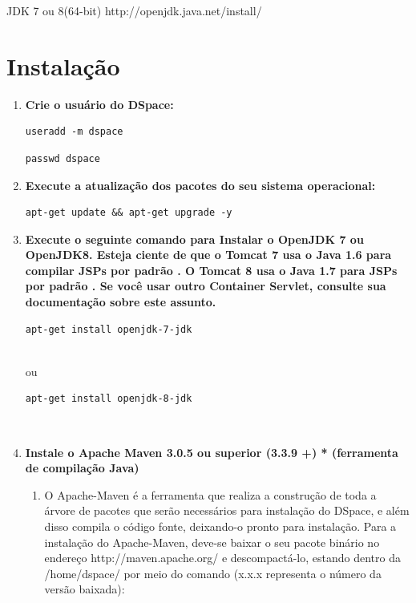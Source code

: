 \documentclass[12pt,hidelinks]{article}
\begin{document}
    \textbullet \hspace{6pt} JDK 7 ou 8(64-bit) http://openjdk.java.net/install/

\newpage
\section{Instalação}
\newpage
\begin{enumerate}
    
    \item \textbf{Crie o usuário do DSpace:} 
    
        \begin{verbatim}
useradd -m dspace
        \end{verbatim}
    
        \begin{verbatim}
passwd dspace
        \end{verbatim}
    
   
    \item \textbf{Execute a atualização dos pacotes do seu sistema operacional:} 
    
        \begin{verbatim}
apt-get update && apt-get upgrade -y
        \end{verbatim}
   
    \item \textbf{Execute o seguinte comando para Instalar o OpenJDK 7 ou OpenJDK8. Esteja ciente de que o Tomcat 7 usa o Java 1.6 para compilar JSPs por padrão . O Tomcat 8 usa o Java 1.7 para JSPs por padrão . Se você usar outro Container Servlet, consulte sua documentação sobre este assunto.}
     
        \begin{verbatim}
apt-get install openjdk-7-jdk
        \end{verbatim}\\
        
        ou
    
        \begin{verbatim}
apt-get install openjdk-8-jdk
        \end{verbatim}\\       
        
    \item \textbf{Instale o Apache Maven 3.0.5 ou superior (3.3.9 +) * (ferramenta de compilação Java)}\\
        \begin{enumerate}
            \item O Apache-Maven é a ferramenta que realiza a construção de toda a árvore de pacotes que serão necessários para instalação do DSpace, e além disso compila o código fonte, deixando-o pronto para instalação. Para a instalação do Apache-Maven, deve-se baixar o seu pacote binário no endereço http://maven.apache.org/ e descompactá-lo, estando dentro da /home/dspace/ por meio do comando (x.x.x representa o número da versão baixada):
        \end{enumerate}
        

\end{enumerate}
\end{document}
